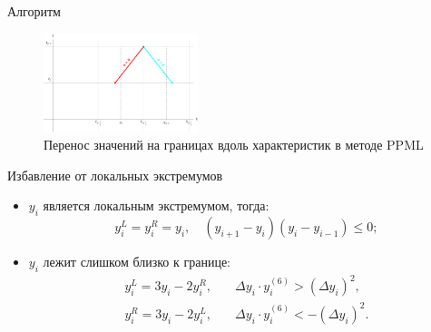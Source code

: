 \documentclass[unicode, 8pt]{beamer}
\begin{document}
    \begin{frame}{Алгоритм}
        \begin{figure}[h]
            \centering
            \includegraphics[width=0.4\textwidth]{ppml_visual.pdf}
            \caption{Перенос значений на границах вдоль характеристик в методе PPML}
            \label{fig:ppml_visual}
        \end{figure}
        \begin{block}{Избавление от локальных экстремумов}
            \begin{itemize}
                \item $ y_i $ является локальным экстремумом, тогда:
                \[
                    y_i^L = y_i^R = y_i, \quad (y_{i+1} - y_i)(y_i - y_{i-1}) \leq 0;
                \]       
                \item $ y_i $ лежит слишком близко к границе:
                \[
                    \begin{split}
                        y_i^L = 3y_i -2y_i^R, &\quad \Delta y_i \cdot y_i^{(6)} > (\Delta y_i)^2, \\
                        y_i^R = 3y_i -2y_i^L, &\quad \Delta y_i \cdot y_i^{(6)} < -(\Delta y_i)^2.
                    \end{split}  
                \]
            \end{itemize}
        \end{block}
    \end{frame}
\end{document}
